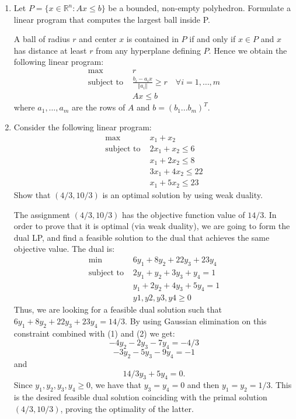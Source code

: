 \documentclass[11pt]{article}
\newcommand{\setR}{\mathbb{R}}
\begin{document}
\begin{enumerate}[1)]
\item Let $P= \{x ∈\setR^n : Ax ≤b\}$ be a bounded, non-empty polyhedron. Formulate a linear program that
computes the largest ball inside P.

\begin{solution}
A ball of radius $r$ and center $x$ is contained in $P$ if and only if $x ∈P$ and $x$ has distance at least $r$
from any hyperplane defining $P$. Hence we obtain the following linear program:
\begin{align*}
\max \quad &r \\
\text{subject to }& \frac{b_i−a_i x}{\Vert a_i \Vert} ≥r \quad \forall i = 1, \hdots, m \\
& Ax ≤b
\end{align*}
where $a_1, \hdots , a_m$ are the rows of $A$ and $b = (b_1 . . . b_m)^T$.
\end{solution}


\item Consider the following linear program:
\begin{align*}
\max \quad & x_1 + x_2 \\
\text{subject to }&2x_1 + x_2 ≤6 \\
&x_1 + 2x_2 ≤8 \\
& 3x_1 + 4x_2 ≤ 22\\
& x_1 + 5x_2 ≤ 23
\end{align*}
Show that $(4/3, 10/3)$ is an optimal solution by using weak duality.


\begin{solution}
The assignment $(4/3, 10/3)$ has the objective function value of $14/3$. In order to prove that it is
optimal (via weak duality), we are going to form the dual LP, and find a feasible solution to the
dual that achieves the same objective value. The dual is:
\begin{align}
\min  \quad & 6y_1 + 8y_2 + 22y_3 + 23y_4 \\
\text{subject to }& 2y_1 + y_2 + 3y_3 + y_4 = 1 \\
&y_1 + 2y_2 + 4y_3 + 5y_4 = 1\\
 & y1, y2, y3, y4 ≥0
\end{align}
Thus, we are looking for a feasible dual solution such that $6y_1 + 8y_2 + 22y_3 + 23y_4 = 14/3$. By using
Gaussian elimination on this constraint combined with (1) and (2) we get:
$$−4y_2−2y_3−7y_4 =−4/3$$
$$−3y_2−5y_3−9y_4 =−1$$
and 
$$14/3y_3 + 5y_4 = 0.$$
Since $y_1, y_2, y_3, y_4 ≥0$, we have that $y_3 = y_4 = 0$ and then $y_1 = y_2 = 1/3$. This is the desired
feasible dual solution coinciding with the primal solution $(4/3, 10/3)$, proving the optimality of the
latter.

\end{solution}


\end{enumerate}



  
\end{document}

